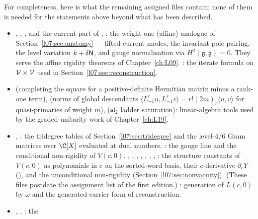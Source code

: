 For completeness, here is what the remaining assigned files contain; none of them is needed for the statements
above beyond what has been described.
\begin{itemize}
\item {}, ,
  , and the current part of
  , : the weight-one
  (affine) analogue of Section~\ref{l07:sec:anatomy} --- lifted current modes, the invariant pole pairing, the
  level variation $k+\delta\mathsf{N}$, and gauge normalisation via $H^2(\mathfrak g,\mathfrak g) = 0$. They serve the affine
  rigidity theorems of Chapter~\ref{ch:L09}. : the iterate formula on
  $\mathcal{V}\times\mathcal{V}$ used in Section~\ref{l07:sec:reconstruction}.
\item {} (completing the square for a positive-definite Hermitian matrix minus a rank-one
  term),  (norms of global descendants
  $\langle L_{-1}^ru,L_{-1}^rv\rangle = r!(2m)_r\langle u,v\rangle$ for quasi-primaries of weight $m$), 
  ($\mathfrak{sl}_2$ ladder saturation): linear-algebra tools used by the graded-unitarity work of Chapter~\ref{ch:L19}.
\item {}, : the tridegree tables of
  Section~\ref{l07:sec:tridegree} and the level-$4$/$6$ Gram matrices over $\C[X]$ evaluated at dual numbers.
  : the gauge line and the conditional non-rigidity of $V(c,0)$.
  , , ,
  , , ,
  , : the structure constants of $V(c,0)$ as polynomials in $c$ on
  the sorted-word basis, their $c$-derivative $\partial_cY$ (), and the unconditional non-rigidity
   (Section~\ref{l07:sec:nonvacuity}). (These files postdate the assignment list of
  the first edition.)
  : generation of $L(c,0)$ by $\omega$ and the generated-carrier form of
  reconstruction.
\item {}, , : the

\end{itemize}
